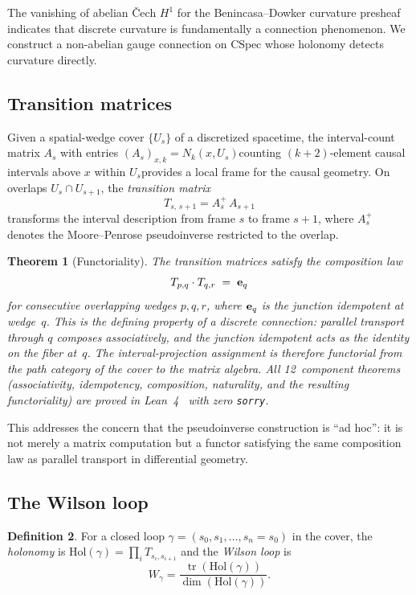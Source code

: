 \documentclass[11pt,a4paper]{article}
\theoremstyle{plain}
\newtheorem{theorem}{Theorem}[section]
\theoremstyle{definition}
\newtheorem{definition}[theorem]{Definition}
\theoremstyle{remark}
\newcommand{\CSpec}{\mathrm{CSpec}}
\newcommand{\Hol}{\mathrm{Hol}}
\begin{document}
The vanishing of abelian \v{C}ech $H^1$ for the Benincasa--Dowker curvature presheaf~\cite{benincasa2010} indicates that discrete curvature is fundamentally a connection phenomenon.
We construct a non-abelian gauge connection on $\CSpec$ whose holonomy detects curvature directly.

\subsection{Transition matrices}

Given a spatial-wedge cover $\{U_s\}$ of a discretized spacetime, the interval-count matrix $A_s$ with entries $(A_s)_{x,k} = N_k(x, U_s)$\textemdash counting $(k{+}2)$-element causal intervals above $x$ within $U_s$\textemdash provides a local frame for the causal geometry.
On overlaps $U_s \cap U_{s+1}$, the \emph{transition matrix}
\[
T_{s,\,s+1} = A_s^+\, A_{s+1}
\]
transforms the interval description from frame $s$ to frame $s+1$, where $A_s^+$ denotes the Moore--Penrose pseudoinverse restricted to the overlap.

\begin{theorem}[Functoriality]\label{thm:functorial}
The transition matrices satisfy the composition law
\[
T_{p,q} \cdot T_{q,r} \;=\; {\bf e}_q
\]
for consecutive overlapping wedges $p, q, r$, where ${\bf e}_q$ is the
junction idempotent at wedge~$q$. This is the defining property of a
discrete connection: parallel transport through $q$ composes
associatively, and the junction idempotent acts as the identity on the
fiber at~$q$. The interval-projection assignment is therefore
\emph{functorial} from the path category of the cover to the matrix
algebra.
All 12~component theorems (associativity, idempotency, composition,
naturality, and the resulting functoriality) are proved in
Lean~4~\cite{leanrepo} with zero \texttt{sorry}.
\end{theorem}

\noindent This addresses the concern that the pseudoinverse construction
is ``ad hoc'': it is not merely a matrix computation but a functor
satisfying the same composition law as parallel transport in
differential geometry.

\subsection{The Wilson loop}

\begin{definition}
For a closed loop $\gamma = (s_0, s_1, \ldots, s_n = s_0)$ in the cover, the \emph{holonomy} is $\Hol(\gamma) = \prod_i T_{s_i, s_{i+1}}$ and the \emph{Wilson loop} is
\[
W_\gamma = \frac{\operatorname{tr}(\Hol(\gamma))}{\dim(\Hol(\gamma))}.
\]
\end{definition}
\end{document}
